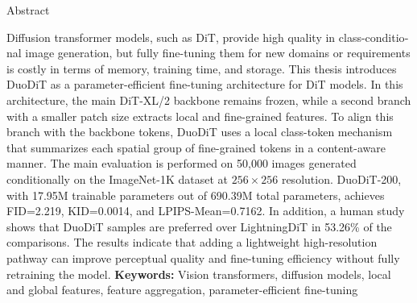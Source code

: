 \begin{latin}
\noindent
\begin{large}
\begin{center}
Abstract
\end{center}
\end{large}
%
Diffusion transformer models, such as DiT, provide high quality in class-conditional image generation, but fully fine-tuning them for new domains or requirements is costly in terms of memory, training time, and storage. This thesis introduces DuoDiT as a parameter-efficient fine-tuning architecture for DiT models. In this architecture, the main DiT-XL/2 backbone remains frozen, while a second branch with a smaller patch size extracts local and fine-grained features. To align this branch with the backbone tokens, DuoDiT uses a local class-token mechanism that summarizes each spatial group of fine-grained tokens in a content-aware manner. The main evaluation is performed on 50,000 images generated conditionally on the ImageNet-1K dataset at $256 \times 256$ resolution. DuoDiT-200, with 17.95M trainable parameters out of 690.39M total parameters, achieves FID=2.219, KID=0.0014, and LPIPS-Mean=0.7162. In addition, a human study shows that DuoDiT samples are preferred over LightningDiT in 53.26\% of the comparisons. The results indicate that adding a lightweight high-resolution pathway can improve perceptual quality and fine-tuning efficiency without fully retraining the model.
\newline
{{\bf Keywords:}}
Vision transformers, diffusion models, local and global features, feature aggregation, parameter-efficient fine-tuning%
\newpage
\latinvtitle%
\end{latin}
